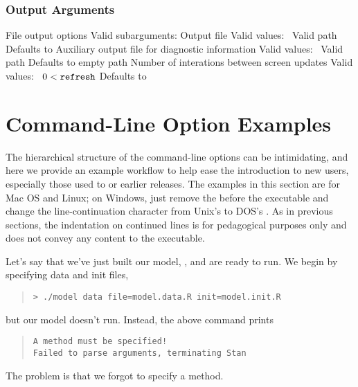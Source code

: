 \subsubsection{Output Arguments}

\begin{description}
  {File output options}
  {Valid subarguments: }
%
    {Output file}
    {Valid values: \  Valid path}
    {Defaults to }
%
    {Auxiliary output file for diagnostic information}
    {Valid values: \  Valid path}
    {Defaults to empty path}
%
    {Number of interations between screen updates}
    {Valid values: \  $0 < \mbox{{\tt refresh}}$}
    {Defaults to }
%
\end{description}

\section{Command-Line Option Examples}

The hierarchical structure of the command-line options can be
intimidating, and here we provide an example workflow to help ease the
introduction to new users, especially those used to  or
earlier releases.  The examples in this section are for Mac OS and
Linux; on Windows, just remove the  before the executable and
change the line-continuation character from Unix's
\code{\textbackslash} to DOS's \code{\textasciicircum}.  As in
previous sections, the indentation on continued lines is for
pedagogical purposes only and does not convey any content to the
executable.

Let's say that we've just built our model, , and are ready to run.
We begin by specifying data and init files,
%
\begin{quote}
\begin{Verbatim}[fontshape=sl]
> ./model data file=model.data.R init=model.init.R
\end{Verbatim}
\end{quote}
%
but our model doesn't run.  Instead, the above command prints
%
\begin{quote}
\begin{Verbatim}
A method must be specified!
Failed to parse arguments, terminating Stan
\end{Verbatim}
\end{quote}
%
The problem is that we forgot to specify a method.

